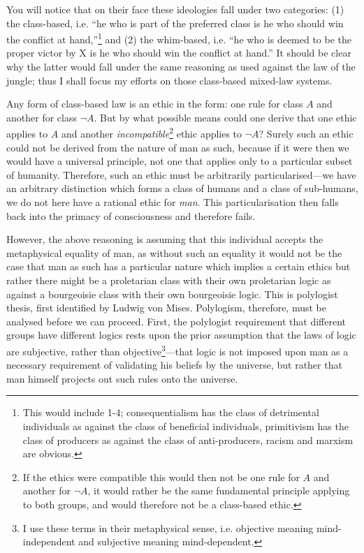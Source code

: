 \documentclass[11pt]{article}
\begin{document}
You will notice that on their face these ideologies fall under two categories: (1) the class-based, i.e. ``he who is part of the preferred class is he who should win the conflict at hand,''\footnote{This would include 1-4; consequentialism has the class of detrimental individuals as against the class of beneficial individuals, primitivism has the class of producers as against the class of anti-producers, racism and marxism are obvious.} and (2) the whim-based, i.e. ``he who is deemed to be the proper victor by X is he who should win the conflict at hand.'' It should be clear why the latter would fall under the same reasoning as used against the law of the jungle; thus I shall focus my efforts on those class-based mixed-law systems.

Any form of class-based law is an ethic in the form: one rule for class \(A\) and another for class \(\neg A\). But by what possible means could one derive that one ethic applies to \(A\) and another \emph{incompatible}\footnote{If the ethics were compatible this would then not be one rule for \(A\) and another for \(\neg A\), it would rather be the same fundamental principle applying to both groups, and would therefore not be a class-based ethic.} ethic applies to \(\neg A\)? Surely such an ethic could not be derived from the nature of man as such, because if it were then we would have a universal principle, not one that applies only to a particular subset of humanity. Therefore, such an ethic must be arbitrarily particularised---we have an arbitrary distinction which forms a class of humans and a class of sub-humans, we do not here have a rational ethic for \emph{man}. This particularisation then falls back into the primacy of consciousness and therefore fails.

However, the above reasoning is assuming that this individual accepts the metaphysical equality of man, as without such an equality it would not be the case that man as such has a particular nature which implies a certain ethics but rather there might be a proletarian class with their own proletarian logic as against a bourgeoisie class with their own bourgeoisie logic. This is polylogist thesis, first identified by Ludwig von Mises. Polylogism, therefore, must be analysed before we can proceed. First, the polylogist requirement that different groups have different logics rests upon the prior assumption that the laws of logic are subjective, rather than objective\footnote{I use these terms in their metaphysical sense, i.e. objective meaning mind-independent and subjective meaning mind-dependent.}---that logic is not imposed upon man as a necessary requirement of validating his beliefs by the universe, but rather that man himself projects out such rules onto the universe.
\end{document}
